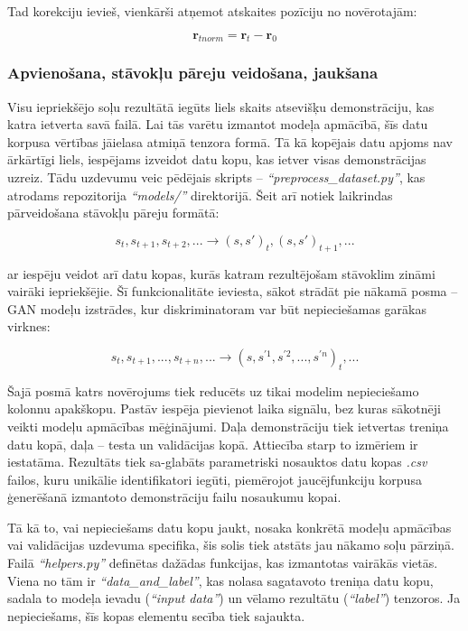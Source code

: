 \documentclass[12pt, a4paper]{article}
\numberwithin{equation}{section} %
\begin{document}
Tad korekciju ievieš, vienkārši atņemot atskaites pozīciju no novērotajām:

\begin{equation}
     \boldsymbol{r}_{tnorm} =  \boldsymbol{r}_t -  \boldsymbol{r}_0
\end{equation}

\subsubsection{Apvienošana, stāvokļu pāreju veidošana, jaukšana}

Visu iepriekšējo soļu rezultātā iegūts liels skaits atsevišķu demonstrāciju, kas katra ietverta savā failā. Lai tās varētu izmantot modeļa apmācībā, šīs datu korpusa vērtības jāielasa atmiņā tenzora formā. Tā kā kopējais datu apjoms nav ārkārtīgi liels, iespējams izveidot datu kopu, kas ietver visas demonstrācijas uzreiz. Tādu uzdevumu veic pēdējais skripts -- \textit{``preprocess\_dataset.py''}, kas atrodams repozitorija \textit{``models/''} direktorijā. Šeit arī notiek laikrindas pārveidošana stāvokļu pāreju formātā:

\begin{equation}
    s_t, s_{t+1}, s_{t+2}, ... \rightarrow (s,s')_t, (s,s')_{t+1}, ...
\end{equation}

ar iespēju veidot arī datu kopas, kurās katram rezultējošam stāvoklim zināmi vairāki iepriekšējie. Šī funkcionalitāte ieviesta, sākot strādāt pie nākamā posma -- GAN modeļu izstrādes, kur diskriminatoram var būt nepieciešamas garākas virknes:

\begin{equation}
    s_t, s_{t+1}, ..., s_{t+n}, ... \rightarrow (s,s^{'1}, s^{'2}, ..., s^{'n})_t, ...
\end{equation}

Šajā posmā katrs novērojums tiek reducēts uz tikai modelim nepieciešamo kolonnu apakškopu. Pastāv iespēja pievienot laika signālu, bez kuras sākotnēji veikti modeļu apmācības mēģinājumi. Daļa demonstrāciju tiek ietvertas treniņa datu kopā, daļa -- testa un validācijas kopā. Attiecība starp to izmēriem ir iestatāma. Rezultāts tiek sa-glabāts parametriski nosauktos datu kopas \textit{.csv} failos, kuru unikālie identifikatori iegūti, piemērojot jaucējfunkciju korpusa ģenerēšanā izmantoto demonstrāciju failu nosaukumu kopai.

Tā kā to, vai nepieciešams datu kopu jaukt, nosaka konkrētā modeļu apmācības vai validācijas uzdevuma specifika, šis solis tiek atstāts jau nākamo soļu pārziņā. Failā \textit{``helpers.py''} definētas dažādas funkcijas, kas izmantotas vairākās vietās. Viena no tām ir \textit{``data\_and\_label''}, kas nolasa sagatavoto treniņa datu kopu, sadala to modeļa ievadu (\textit{``input data''}) un vēlamo rezultātu (\textit{``label''}) tenzoros. Ja nepieciešams, šīs kopas elementu secība tiek sajaukta.
\end{document}
